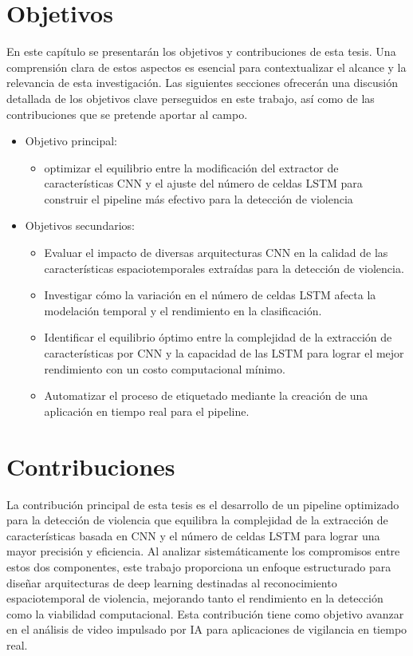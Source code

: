 \section{Objetivos}
En este capítulo se presentarán los objetivos y contribuciones de 
esta tesis. Una comprensión clara de estos aspectos es 
esencial para contextualizar el alcance y la relevancia de 
esta investigación. Las siguientes secciones ofrecerán una 
discusión detallada de los objetivos clave perseguidos en 
este trabajo, así como de las contribuciones que se pretende 
aportar al campo.
\begin{itemize}
  \item { Objetivo principal: 
      \begin{itemize}
          \item optimizar el equilibrio entre la modificación 
          del extractor de características CNN y el ajuste del 
          número de celdas LSTM para construir el pipeline más 
          efectivo para la detección de violencia
      \end{itemize}
   }
   \item { Objetivos secundarios:
      \begin{itemize}
          \item Evaluar el impacto de diversas arquitecturas 
          CNN en la calidad de las características 
          espaciotemporales extraídas para la detección de 
          violencia.
          \item Investigar cómo la variación en el número 
          de celdas LSTM afecta la modelación temporal y el 
          rendimiento en la clasificación.
          \item Identificar el equilibrio óptimo entre la 
          complejidad de la extracción de características por 
          CNN y la capacidad de las LSTM para lograr el mejor 
          rendimiento con un costo computacional mínimo.
          \item Automatizar el proceso de etiquetado mediante la 
          creación de una aplicación en tiempo real para el pipeline.
      \end{itemize}
      }
\end{itemize}

\section{Contribuciones}

La contribución principal de esta tesis es el desarrollo de 
un pipeline optimizado para la detección de violencia que 
equilibra la complejidad de la extracción de características 
basada en CNN y el número de celdas LSTM para lograr una 
mayor precisión y eficiencia. Al analizar sistemáticamente 
los compromisos entre estos dos componentes, este trabajo 
proporciona un enfoque estructurado para diseñar arquitecturas 
de deep learning destinadas al reconocimiento espaciotemporal 
de violencia, mejorando tanto el rendimiento en la detección 
como la viabilidad computacional. Esta contribución tiene 
como objetivo avanzar en el análisis de video impulsado por 
IA para aplicaciones de vigilancia en tiempo real.
